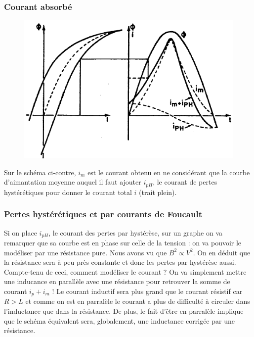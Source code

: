 		\subsubsection{Courant absorbé}
		\begin{figure}
		\includegraphics[scale=0.3]{ch3/image5.png}
		\end{figure}
		Sur le schéma ci-contre, $i_m$ 
		est le courant obtenu en ne considérant que la courbe d'aimantation 
		moyenne auquel il faut ajouter $i_{pH}$, le courant de pertes 
		hystérétiques pour donner le courant total $i$ (trait plein).
		
		
		\subsubsection{Pertes hystérétiques et par courants de Foucault}
		Si on place $i_{pH}$, le courant des pertes par hystérèse, sur un graphe
		 on va remarquer que sa courbe est en phase sur celle de la tension : 
		 on va pouvoir le modéliser par une résistance pure. Nous avons vu que 
		 $B^2\propto V^2$. On en déduit que la résistance sera à peu près 
		 constante et donc les pertes par hystérèse aussi.		\\
		 
		Compte-tenu de ceci, comment modéliser le courant ? On va simplement 
		mettre une inducance en parallèle avec une résistance pour retrouver 
		la somme de courant $i_p+i_m$ ! Le courant inductif sera plus grand 
		que le courant résistif car $R > L$ et comme on est en parralèle le 
		courant a plus de difficulté à circuler dans l'inductance que dans 
		la résistance. De plus, le fait d'être en parralèle implique que 
		le schéma équivalent sera, globalement, une inductance corrigée 
		par une résistance.
		
